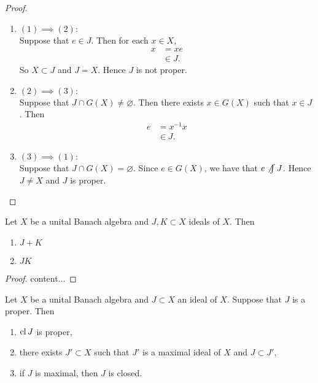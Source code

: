 \documentclass{book}
\begin{document}
	\begin{proof}\
		\begin{enumerate}
			\item $(1) \implies (2):$ \\
			Suppose that $e \in J$. Then for each $x \in X$, 
			\begin{align*}
				x
				& = xe \\
				& \in J.
			\end{align*}
			So $X \subset J$ and $J = X$. Hence $J$ is not proper. 
			\item $(2) \implies (3):$ \\
			Suppose that $J \cap G(X) \neq \varnothing$. Then there exists $x \in G(X)$ such that $x \in J$. Then 
			\begin{align*}
				e
				& = x^{-1} x \\
				& \in J. 
			\end{align*}
			\item $(3) \implies (1):$ \\
			Suppose that $J \cap G(X) = \varnothing$. Since $e \in G(X)$, we have that $e \not \int J$. Hence $J \neq X$ and $J$ is proper.
		\end{enumerate}
	\end{proof}

	\begin{ex}
		Let $X$ be a unital Banach algebra and $J,K \subset X$ ideals of $X$. Then 
		\begin{enumerate}
			\item $J+K$
			\item $JK$
		\end{enumerate}
	\end{ex}

	\begin{proof}
		content...
	\end{proof}

	\begin{ex}
		Let $X$ be a unital Banach algebra and $J \subset X$ an ideal of $X$. Suppose that $J$ is a proper. Then
		\begin{enumerate}
			\item $\operatorname{cl} J$ is proper,
			\item there exists $J' \subset X$ such that $J'$ is a maximal ideal of $X$ and $J \subset J'$,
			\item if $J$ is maximal, then $J$ is closed.
		\end{enumerate}
	\end{ex}
\end{document}
